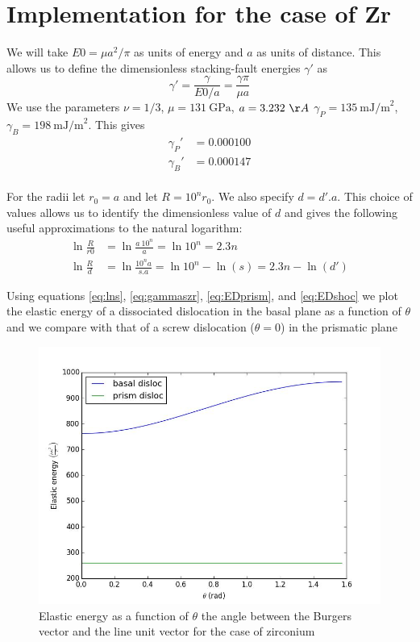 \documentclass[10pt,a4paper,draft]{article}
\begin{document}
\section{Implementation for the case of Zr}
We will take $E0 = \mu a^2/\pi$ as units of energy and $a$ as units of distance. This allows us to define the dimensionless stacking-fault energies $\gamma'$ as 
\begin{equation}
\gamma' = \frac{\gamma}{E0/a} = \frac{\gamma\pi}{\mu a} \label{eq:dimgamma} 
\end{equation}
We use the parameters $\nu=1/3$, $\mu=131~\text{GPa}$, $a=3.232~\AA$ $\gamma_P=135 ~\text{mJ/m}^2$, $\gamma_B = 198 ~\text{mJ/m}^2$.
This gives
\begin{equation}
\begin{split}
\gamma_P' &= 0.000100 \\
\gamma_B' &= 0.000147
\end{split}
\label{eq:gammaszr}
\end{equation}\\

For the radii let $r_0=a$ and let $R=10^nr_0$. We also specify $d = d'.a$. This choice of values allows us to identify the dimensionless value of $d$ and gives the following useful approximations to the natural logarithm:
\begin{equation}
\begin{split}
\ln\frac{R}{r0} &= \ln\frac{a~10^n}{a} = \ln10^n = 2.3n \\
\ln\frac{R}{d} &= \ln\frac{10^na}{s.a} = \ln10^n - \ln(s) = 2.3n - \ln(d')
\end{split}
\label{eq:lns}
\end{equation}

Using equations \ref{eq:lns}, \ref{eq:gammaszr}, \ref{eq:EDprism}, and \ref{eq:EDshoc} we plot the elastic energy of a dissociated dislocation in the basal plane as a function of $\theta$ and we compare with that of a screw dislocation ($\theta=0$) in the prismatic plane

\begin{figure}[hbtp]
\centering
\includegraphics[scale=0.1]{zr}
\caption{Elastic energy as a function of $\theta$ the angle between the Burgers vector and the line unit vector for the case of zirconium}
\end{figure}




\end{document}

